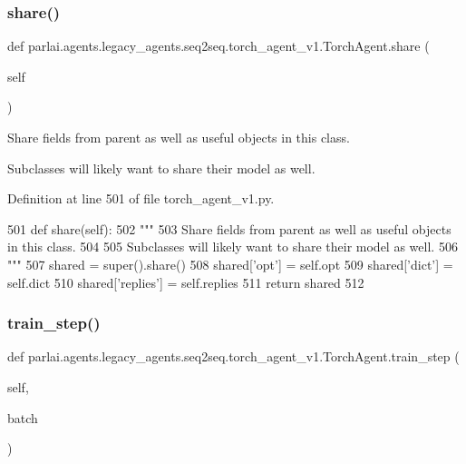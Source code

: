 \subsubsection{\texorpdfstring{share()}{share()}}
{\footnotesize\ttfamily def parlai.\+agents.\+legacy\+\_\+agents.\+seq2seq.\+torch\+\_\+agent\+\_\+v1.\+Torch\+Agent.\+share (\begin{DoxyParamCaption}\item[{}]{self }\end{DoxyParamCaption})}

\begin{DoxyVerb}Share fields from parent as well as useful objects in this class.

Subclasses will likely want to share their model as well.
\end{DoxyVerb}
 

Definition at line 501 of file torch\+\_\+agent\+\_\+v1.\+py.


\begin{DoxyCode}
501     \textcolor{keyword}{def }share(self):
502         \textcolor{stringliteral}{"""}
503 \textcolor{stringliteral}{        Share fields from parent as well as useful objects in this class.}
504 \textcolor{stringliteral}{}
505 \textcolor{stringliteral}{        Subclasses will likely want to share their model as well.}
506 \textcolor{stringliteral}{        """}
507         shared = super().share()
508         shared[\textcolor{stringliteral}{'opt'}] = self.opt
509         shared[\textcolor{stringliteral}{'dict'}] = self.dict
510         shared[\textcolor{stringliteral}{'replies'}] = self.replies
511         \textcolor{keywordflow}{return} shared
512 
\end{DoxyCode}
\mbox{\label{classparlai_1_1agents_1_1legacy__agents_1_1seq2seq_1_1torch__agent__v1_1_1TorchAgent_aff9cc5c105bbf154075aa83e288582ca}} 
\subsubsection{\texorpdfstring{train\+\_\+step()}{train\_step()}}
{\footnotesize\ttfamily def parlai.\+agents.\+legacy\+\_\+agents.\+seq2seq.\+torch\+\_\+agent\+\_\+v1.\+Torch\+Agent.\+train\+\_\+step (\begin{DoxyParamCaption}\item[{}]{self,  }\item[{}]{batch }\end{DoxyParamCaption})}

